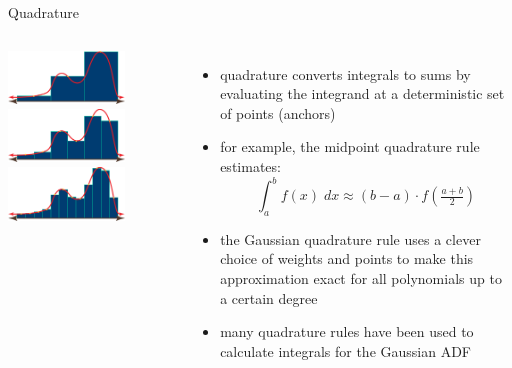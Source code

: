 \documentclass[aspectratio=169,19pt,xetex,handout]{beamer}
\begin{document}
\begin{frame}{Quadrature}

\begin{columns}
\begin{center}
\includegraphics[width=0.7\textwidth]{q1}\\
\vspace{8pt}
\includegraphics[width=0.7\textwidth]{q2}\\
\vspace{8pt}
\includegraphics[width=0.7\textwidth]{q3}
\end{center}


\begin{itemize}
\item quadrature converts integrals to sums by evaluating the integrand at a deterministic set of points (anchors)
\item for example, the midpoint quadrature rule estimates:
\[
\int_a^b f(x)\; dx \approx (b-a)\cdot f(\tfrac{a+b}{2})
\]
\item the Gaussian quadrature rule uses a clever choice of weights and points to make this approximation exact for all polynomials up to a certain degree~\cite{Gol73}
\item many quadrature rules have been used to calculate integrals for the Gaussian ADF
\end{itemize}

\end{columns}

\end{frame}
\end{document}
